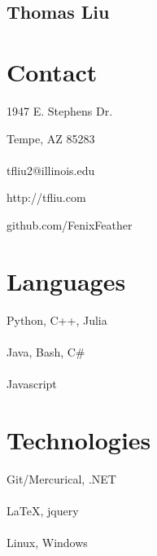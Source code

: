 \documentclass[letterpaper,10pt]{article}
\begin{document}
\pagestyle{empty}
\begin{center}\section*{ \fontsize{48}{16}\selectfont Thomas Liu}\end{center}
\begin{minipage}[t][0em][t]{0.2\textwidth}
  \section*{\bf \huge Contact}
{\small 1947 E. Stephens Dr.

Tempe, AZ 85283\\
~\\
tfliu2@illinois.edu

http://tfliu.com

github.com/FenixFeather
}
  \section*{\huge Languages}
  \begin{flushleft}{\small
      Python, C++, Julia\\
      ~\\
Java, Bash, C#\\
      ~\\
Javascript
    }\end{flushleft}

\section*{\huge Technologies}
  \begin{flushleft}{\small
      Git/Mercurical, .NET\\
      ~\\
LaTeX, jquery\\
      ~\\
Linux, Windows
    }\end{flushleft}
\end{minipage}\hspace{0.5cm}
\end{document}

